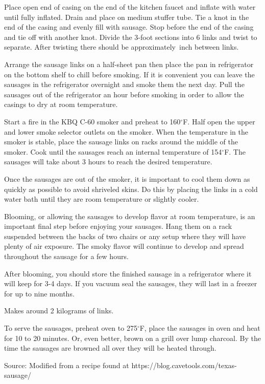 \documentclass[letterpaper]{recipePMG}
\renewcommand{\deg}{$^\circ$}
\newcommand{\threequarters}{\nicefrac{3}{4} \,}
\begin{document}
Place open end of casing on the end of the kitchen faucet and inflate with water until fully inflated. Drain and place on medium stuffer tube. Tie a knot in the end of the casing and evenly fill with sausage. Stop before the end of the casing and tie off with another knot.  Divide the 3-foot sections into 6 links and twist to separate. After twisting there should be approximately \threequarters inch between links. 


Arrange the sausage links on a half-sheet pan then place the pan in refrigerator on the bottom shelf to chill before smoking. If it is convenient you can leave the sausages in the refrigerator overnight and smoke them the next day. Pull the sausages out of the refrigerator an hour before smoking in order to allow the casings to dry at room temperature.

Start a fire in the KBQ C-60 smoker and preheat to 160\deg F. Half open the upper and lower smoke selector outlets on the  smoker.  When the temperature in the smoker is stable, place the sausage links on racks around the middle of the smoker. Cook until  the sausages reach an internal temperature of 154\deg F.  The sausages will take about 3 hours to reach the desired temperature.
   
Once the sausages are out of the smoker, it is important to cool them down as quickly as possible to avoid shriveled skins. Do this by placing the links in a cold water bath until they are room temperature or slightly cooler.


Blooming, or allowing the sausages to develop flavor at room temperature, is an important final step before enjoying your sausages. Hang them on a rack suspended between the backs of two chairs or any setup where they will have plenty of air exposure. The smoky flavor will continue to develop and spread throughout the sausage for a few hours. 

After blooming, you should store the finished sausage in a refrigerator where it will keep for 3-4 days. If you vacuum seal the sausages, they will last in a freezer for up to nine months.

Makes around 2 kilograms of links.

To serve the sausages, preheat oven to 275\deg F, place the sausages in oven and heat for 10 to 20 minutes. Or, even better, brown on a grill over lump charcoal. By the time the sausages are browned all over they will be heated through.

Source: Modified from a recipe found at https://blog.cavetools.com/texas-sausage/
\end{document}
